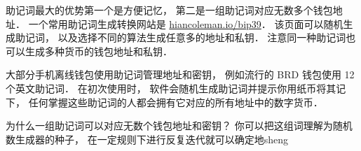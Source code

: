 助记词最大的优势第一个是方便记忆， 第二是一组助记词对应无数多个钱包地址． 一个常用助记词生成转换网站是 \href{https://iancoleman.io/bip39/}{hiancoleman.io/bip39}． 该页面可以随机生成助记词， 以及选择不同的算法生成任意多的地址和私钥． 注意同一种助记词也可以生成多种货币的钱包地址和私钥．

大部分手机离线钱包使用助记词管理地址和密钥， 例如流行的 BRD 钱包使用 12 个英文助记词． 在初次使用时， 软件会随机生成助记词并提示你用纸币将其记下， 任何掌握这些助记词的人都会拥有它对应的所有地址中的数字货币．

为什么一组助记词可以对应无数个钱包地址和密钥？ 你可以把这组词理解为随机数生成器的种子， 在一定规则下进行反复迭代就可以确定地sheng
